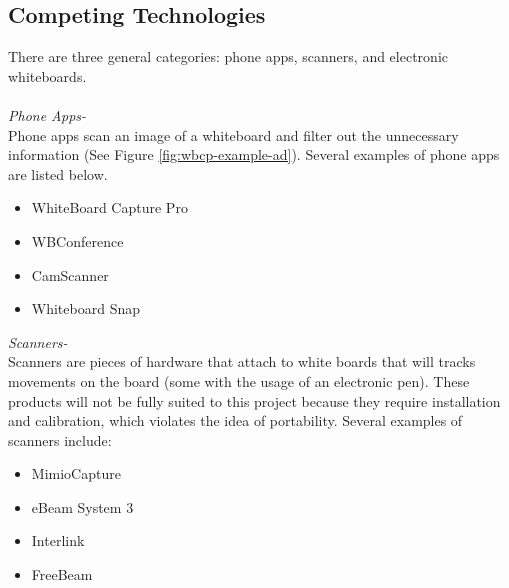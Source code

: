 \documentclass{article}
\begin{document}
		\subsection*{Competing Technologies}
			There are three general categories: phone apps, scanners, and electronic whiteboards.\\
			\\
			\emph{Phone Apps-}\\
			Phone apps scan an image of a whiteboard and filter out the unnecessary information (See Figure \ref{fig:wbcp-example-ad}). Several examples of phone apps are listed below.
			\begin{itemize}
				\item WhiteBoard Capture Pro
				\item WBConference
				\item CamScanner
				\item Whiteboard Snap
			\end{itemize} 
			
			
			\noindent \emph{Scanners-}\\
			Scanners are pieces of hardware that attach to white boards that will tracks movements on the board (some with the usage of an electronic pen). These products will not be fully suited to this project because they require installation and calibration, which violates the idea of portability. Several examples of scanners include:
			\begin{itemize}
				\item MimioCapture
				\item eBeam System 3
				\item Interlink
				\item FreeBeam
			\end{itemize}
			
\end{document}
